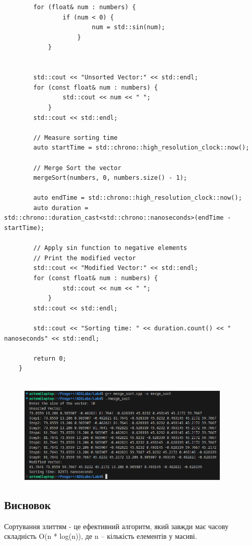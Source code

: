 \documentclass[12pt]{extarticle}
\begin{document}
{\begin{verbatim}
        for (float& num : numbers) {
                if (num < 0) {
                        num = std::sin(num);
                    }
            }


        std::cout << "Unsorted Vector:" << std::endl;
        for (const float& num : numbers) {
                std::cout << num << " ";
            }
        std::cout << std::endl;

        // Measure sorting time
        auto startTime = std::chrono::high_resolution_clock::now();

        // Merge Sort the vector
        mergeSort(numbers, 0, numbers.size() - 1);

        auto endTime = std::chrono::high_resolution_clock::now();
        auto duration = std::chrono::duration_cast<std::chrono::nanoseconds>(endTime - startTime);

        // Apply sin function to negative elements
        // Print the modified vector
        std::cout << "Modified Vector:" << std::endl;
        for (const float& num : numbers) {
                std::cout << num << " ";
            }
        std::cout << std::endl;

        std::cout << "Sorting time: " << duration.count() << " nanoseconds" << std::endl;

        return 0;
    }


\end{verbatim}
}
\vspace{12pt}
\begin{figure}[H]
    \centering
    \includegraphics[width=0.90\textwidth]{Screenshot_20231018_002440.png}
    \caption{}
\end{figure}
\subsection*{Висновок} 
Сортування злиттям - це ефективний алгоритм, який завжди має часову складність O(n * log(n)), де n -- кількість елементів у масиві.
\end{document}
